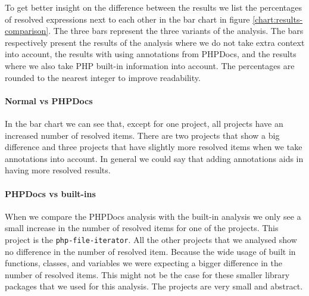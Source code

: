 \documentclass[../main.tex]{subfiles}
\begin{document}
	To get better insight on the difference between the results we list the percentages of resolved expressions next to each other in the bar chart in figure \ref{chart:results-comparison}.
	The three bars represent the three variants of the analysis.
	The bars respectively present the results of the analysis where we do not take extra context into account, the results with using annotations from PHPDocs, and the results where we also take PHP built-in information into account.
	The percentages are rounded to the nearest integer to improve readability.
	
	\paragraph{Normal vs PHPDocs}
	In the bar chart we can see that, except for one project, all projects have an increased number of resolved items.
	There are two projects that show a big difference and three projects that have slightly more resolved items when we take annotations into account.
	In general we could say that adding annotations aids in having more resolved results.
	
	\paragraph{PHPDocs vs built-ins}
	When we compare the PHPDocs analysis with the built-in analysis we only see a small increase in the number of resolved items for one of the projects.
	This project is the \texttt{php-file-iterator}.
	All the other projects that we analysed show no difference in the number of resolved item.
	Because the wide usage of built in functions, classes, and variables we were expecting a bigger difference in the number of resolved items.
	This might not be the case for these smaller library packages that we used for this analysis.
	The projects are very small and abstract.
		
\end{document}
